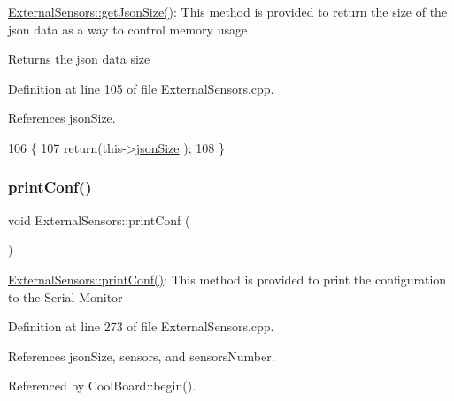 \hyperlink{classExternalSensors_a8e3a93efa8f5a0477f300e26084b6625}{External\+Sensors\+::get\+Json\+Size()}\+: This method is provided to return the size of the json data as a way to control memory usage

\begin{DoxyReturn}{Returns}
the json data size 
\end{DoxyReturn}


Definition at line 105 of file External\+Sensors.\+cpp.



References json\+Size.


\begin{DoxyCode}
106 \{
107     \textcolor{keywordflow}{return}(this->\hyperlink{classExternalSensors_acacea86d74d967b57fcff282d26cff57}{jsonSize} );
108 \}
\end{DoxyCode}
\mbox{\label{classExternalSensors_a78c2bf55084435dd51d3c559b2d3c6f3}} 
\subsubsection{\texorpdfstring{print\+Conf()}{printConf()}}
{\footnotesize\ttfamily void External\+Sensors\+::print\+Conf (\begin{DoxyParamCaption}{ }\end{DoxyParamCaption})}

\hyperlink{classExternalSensors_a78c2bf55084435dd51d3c559b2d3c6f3}{External\+Sensors\+::print\+Conf()}\+: This method is provided to print the configuration to the Serial Monitor 

Definition at line 273 of file External\+Sensors.\+cpp.



References json\+Size, sensors, and sensors\+Number.



Referenced by Cool\+Board\+::begin().


